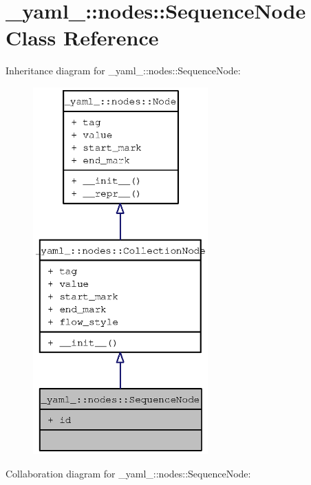 \section{\_\-yaml\_\-::nodes::SequenceNode Class Reference}
\label{class__yaml___1_1nodes_1_1SequenceNode}
Inheritance diagram for \_\-yaml\_\-::nodes::SequenceNode:\nopagebreak
\begin{figure}[H]
\begin{center}
\leavevmode
\includegraphics[height=400pt]{class__yaml___1_1nodes_1_1SequenceNode__inherit__graph}
\end{center}
\end{figure}
Collaboration diagram for \_\-yaml\_\-::nodes::SequenceNode:\nopagebreak
